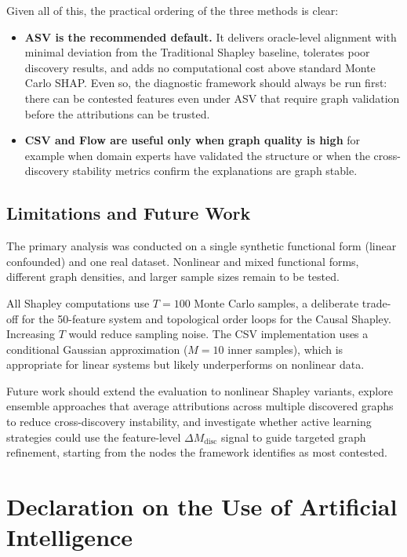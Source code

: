 \documentclass[12pt,a4paper,oneside]{article}
\begin{document}
Given all of this, the practical ordering of the three methods is clear:
\begin{itemize}
  \item \textbf{ASV is the recommended default.} It delivers oracle-level alignment with minimal deviation from the Traditional Shapley baseline, tolerates poor discovery results, and adds no computational cost above standard Monte Carlo SHAP. Even so, the diagnostic framework should always be run first: there can be contested features even under ASV that require graph validation before the attributions can be trusted.
  \item \textbf{CSV and Flow are useful only when graph quality is high} for example when domain experts have validated the structure or when the cross-discovery stability metrics confirm the explanations are graph stable.
\end{itemize}

\subsection{Limitations and Future Work}

The primary analysis was conducted on a single synthetic functional form (linear confounded) and one real dataset. Nonlinear and mixed functional forms, different graph densities, and larger sample sizes remain to be tested.

All Shapley computations use $T = 100$ Monte Carlo samples, a deliberate trade-off for the 50-feature system and topological order loops for the Causal Shapley. Increasing $T$ would reduce sampling noise. The CSV implementation uses a conditional Gaussian approximation ($M = 10$ inner samples), which is appropriate for linear systems but likely underperforms on nonlinear data.

Future work should extend the evaluation to nonlinear Shapley variants, explore ensemble approaches that average attributions across multiple discovered graphs to reduce cross-discovery instability, and investigate whether active learning strategies could use the feature-level $\Delta M_{\text{disc}}$ signal to guide targeted graph refinement, starting from the nodes the framework identifies as most contested.

\newpage
\section*{Declaration on the Use of Artificial Intelligence}
\end{document}
